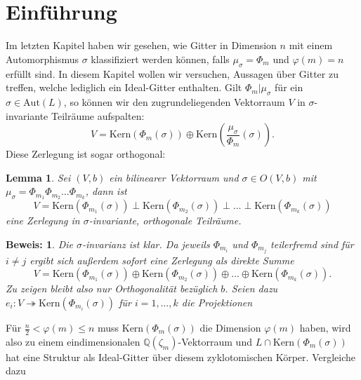 \documentclass[12pt,a4paper,halfparskip,headsepline,bibtotocnumbered]{scrreprt}
\theoremstyle{nummermitklammern}
\newtheorem{lemma}[defsatzusw]{Lemma}
\theoremstyle{nonumberbreak}
\newtheorem{beweis}{Beweis:}
\newcommand{\Q}{\mathbb{Q}}
\newcommand{\Kern}{\text{Kern}}
\newcommand{\Aut}{\text{Aut}}
\begin{document}
\section{Einführung}
Im letzten Kapitel haben wir gesehen, wie Gitter in Dimension $n$ mit einem Automorphismus $\sigma$ klassifiziert werden können, falls $\mu_\sigma = \Phi_m$ und $\varphi(m) = n$ erfüllt sind. In diesem Kapitel wollen wir versuchen, Aussagen über Gitter zu treffen, welche lediglich ein Ideal-Gitter enthalten. Gilt $\Phi_m \vert \mu_\sigma$ für ein $\sigma \in \Aut(L)$, so können wir den zugrundeliegenden Vektorraum $V$ in $\sigma$-invariante Teilräume aufspalten:
\begin{equation*}
	V = \Kern(\Phi_m(\sigma)) \oplus \Kern\left(\frac{\mu_\sigma}{\Phi_m}(\sigma)\right).
\end{equation*}
Diese Zerlegung ist sogar orthogonal:
\begin{framed}
	\begin{lemma}
		Sei $(V,b)$ ein bilinearer Vektorraum und $\sigma \in O(V,b)$ mit $\mu_\sigma = \Phi_{m_1} \Phi_{m_2} \dots \Phi_{m_k}$, dann ist
		\begin{equation*}
			V = \Kern(\Phi_{m_1}(\sigma)) \perp \Kern(\Phi_{m_2}(\sigma)) \perp \dots \perp \Kern(\Phi_{m_k}(\sigma))
		\end{equation*}
		eine Zerlegung in $\sigma$-invariante, orthogonale Teilräume.
	\end{lemma}
\end{framed}

\begin{beweis}
	Die $\sigma$-invarianz ist klar. Da jeweils $\Phi_{m_i}$ und $\Phi_{m_j}$ teilerfremd sind für $i \neq j$ ergibt sich außerdem sofort eine Zerlegung als direkte Summe
	\begin{equation*}
			V = \Kern(\Phi_{m_1}(\sigma)) \oplus \Kern(\Phi_{m_2}(\sigma)) \oplus \dots \oplus \Kern(\Phi_{m_k}(\sigma)).
		\end{equation*}
		Zu zeigen bleibt also nur Orthogonalität bezüglich $b$. Seien dazu $e_i : V \twoheadrightarrow \Kern(\Phi_{m_i}(\sigma))$ für $i=1,\dots,k$ die Projektionen 
\end{beweis}

Für $\frac{n}{2} < \varphi(m) \leq n$ muss $\Kern(\Phi_m(\sigma))$ die Dimension $\varphi(m)$ haben, wird also zu einem eindimensionalen $\Q(\zeta_m)$-Vektorraum und $L \cap \Kern(\Phi_m(\sigma))$ hat eine Struktur als Ideal-Gitter über diesem zyklotomischen Körper. Vergleiche dazu \cite[Abs. (5.3)]{nebe}
\end{document}
